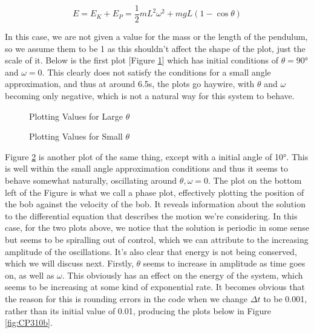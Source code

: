 \documentclass[12pt]{article}
\begin{document}
    \begin{equation}
        E = E_K + E_P = \frac{1}{2}mL^2 \omega^2 + mgL(1-\cos\theta)
    \end{equation}

    \noindent
    In this case, we are not given a value for the mass or the length of the pendulum, so 
    we assume them to be 1 as this shouldn't affect the shape of the plot, just the scale 
    of it. Below is the first plot [Figure \ref{fig:CP390}] which has initial conditions 
    of $\theta = \ang{90}$ and $\omega = 0$. This clearly does not satisfy the conditions 
    for a small angle approximation, and thus at around 6.5s, the plots go haywire, with 
    $\theta$ and $\omega$ becoming only negative, which is not a natural way for this 
    system to behave. 

    \begin{figure}[H]
        \begin{center}
           \scalebox{.7}{}
           \caption{Plotting Values for Large $\theta$}
           \label{fig:CP390}
        \end{center}
    \end{figure}

    \begin{figure}[H]
        \begin{center}
           \scalebox{.7}{}
           \caption{Plotting Values for Small $\theta$}
           \label{fig:CP310}
        \end{center}
    \end{figure}

    \newpage\noindent
    Figure \ref{fig:CP310} is another plot of the same thing, except with a initial 
    angle of \ang{10}. This is well within the small angle approximation conditions and thus 
    it seems to behave somewhat naturally, oscillating around $\theta, \omega = 0$.
    \newline
    \newline
    The plot on the bottom left of the Figure is what we call a phase plot, effectively plotting 
    the position of the bob against the velocity of the bob. It reveals information about the 
    solution to the differential equation that describes the motion we're considering. In this 
    case, for the two plots above, we notice that the solution is periodic in some sense but 
    seems to be spiralling out of control, which we can attribute to the increasing amplitude 
    of the oscillations. It's also clear that energy is not being conserved, which we will 
    discuss next.
    \newline
    Firstly, $\theta$ seems to increase in amplitude as time goes on, as well as $\omega$. 
    This obviously has an effect on the energy of the system, which seems to be increasing 
    at some kind of exponential rate. It becomes obvious that the reason for this is rounding 
    errors in the code when we change $\Delta t$ to be 0.001, rather than its initial value of 
    0.01, producing the plots below in Figure \ref{fig:CP310b}.
\end{document}
